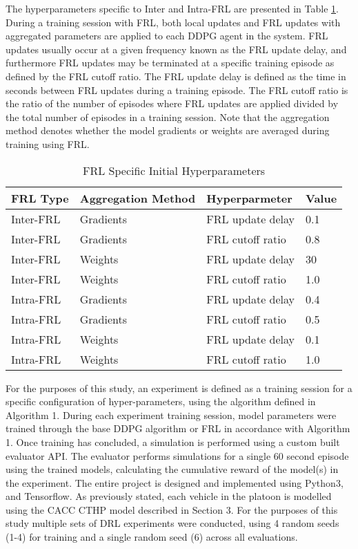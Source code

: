 The hyperparameters specific to Inter and Intra-FRL are presented in Table \ref{tab:frlhyps}. 
During a training session with FRL, both local updates and FRL updates with aggregated 
parameters are applied to each DDPG agent in the system. FRL updates usually
occur at a given frequency known as the FRL update delay, and furthermore FRL updates
may be terminated at a specific training episode as defined by the FRL cutoff ratio.  The 
FRL update delay is defined as the time in seconds between FRL updates during a training 
episode. The FRL cutoff ratio is the ratio of the number of episodes where FRL updates 
are applied divided by the total number of episodes in a training session. Note that the 
aggregation method denotes whether the model gradients or weights are averaged during 
training using FRL.
\begin{table}[H]
    \caption{FRL Specific Initial Hyperparameters}
    \centering
    \tiny
    \begin{tabular}{llll}
        \toprule
        FRL Type & Aggregation Method & Hyperparmeter & Value \\
        \midrule
        Inter-FRL & Gradients & FRL update delay &  0.1 \\
        Inter-FRL & Gradients & FRL cutoff ratio &  0.8  \\
        Inter-FRL & Weights & FRL update delay &  30  \\
        Inter-FRL & Weights & FRL cutoff ratio &  1.0   \\
        Intra-FRL & Gradients & FRL update delay &  0.4  \\
        Intra-FRL & Gradients & FRL cutoff ratio &  0.5  \\
        Intra-FRL & Weights & FRL update delay &  0.1  \\
        Intra-FRL & Weights & FRL cutoff ratio &  1.0  \\
        \bottomrule
    \end{tabular}
    \label{tab:frlhyps}
\end{table}

For the purposes of this study, an experiment is defined as a training session for a 
specific configuration of hyper-parameters, using the algorithm defined in Algorithm 1. 
During each experiment training session, model parameters were trained through the base 
DDPG algorithm or FRL in accordance with Algorithm 1. Once training has concluded, a 
simulation is performed using a custom built evaluator API.  The evaluator performs 
simulations for a single 60 second episode using the trained models, calculating the 
cumulative reward of the model(s) in the experiment.  The entire project is designed and 
implemented using Python3, and Tensorflow.  As previously stated, each vehicle in the 
platoon is modelled using the CACC CTHP model described in Section 3.  For the purposes 
of this study multiple sets of DRL experiments were conducted, using 4 random seeds (1-4) 
for training and a single random seed (6) across all evaluations.

